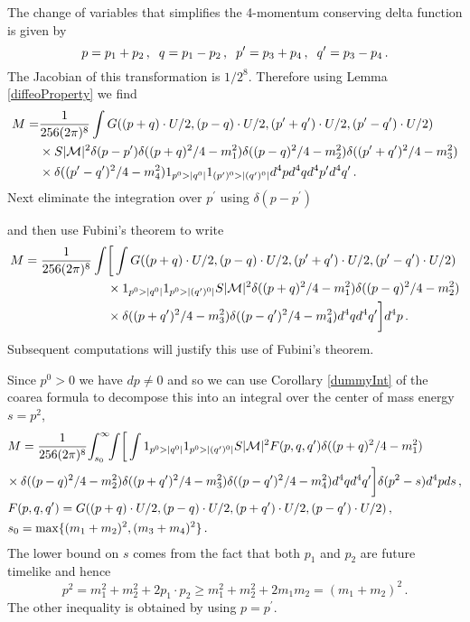 The change of variables that simplifies the 4-momentum conserving delta function is given by
\begin{equation}
p=p_1+p_2\,,\hspace{2mm} q=p_1-p_2\,, \hspace{2mm} p^{\prime}=p_3+p_4\,, \hspace{2mm} q^{\prime}=p_3-p_4\,.
\end{equation}
The Jacobian of this transformation is $1/2^{8}$.  Therefore using Lemma \ref{diffeoProperty} we find
\begin{align}\label{Meq1}
M=&\frac{1}{256(2\pi)^8 }\int   G((p+q)\cdot U/2,(p-q)\cdot  U/2,(p^{\prime}+q^{\prime})\cdot U/2, (p^{\prime}-q^{\prime})\cdot U/2)\notag\\ 
&\times S |\mathcal{M}|^2  \delta(p-p^{\prime})\delta((p+q)^2/4-m_1^2)\delta((p-q)^2/4-m_2^2)\delta((p^{\prime}+q^{\prime})^2/4-m_3^2)\notag\\
&\times\delta((p^{\prime}-q^{\prime})^2/4-m_4^2)1_{p^0>|q^0|} 1_{(p^{\prime})^0>|(q^{\prime})^0|}d^4pd^4qd^4p^{\prime}d^4q^{\prime}\,.
\end{align}
Next eliminate the integration over $p^{\prime}$ using $\delta(p-p^{\prime})$
 \begin{comment} 
using associative property
\end{comment}
 and then use Fubini's theorem to write
\begin{align}\label{useFubini}
M=\frac{1}{256(2\pi)^8 }\int &\bigg[ \int G((p+q)\cdot U/2,(p-q)\cdot  U/2,(p^{\prime}+q^{\prime})\cdot U/2, (p^{\prime}-q^{\prime})\cdot U/2)\notag\\ 
&\times  1_{p^0>|q^0|} 1_{p^0>|(q^{\prime})^0|}S |\mathcal{M}|^2 \delta((p+q)^2/4-m_1^2)\delta((p-q)^2/4-m_2^2)\notag\\
&\times \delta((p+q^{\prime})^2/4-m_3^2)\delta((p-q^{\prime})^2/4-m_4^2)d^4qd^4q^{\prime}\bigg]d^4p\,.
\end{align}
Subsequent computations will justify this use of Fubini's theorem.


Since $p^0>0$ we have $dp\neq 0$ and so we can use Corollary \ref{dummyInt} of the coarea formula to decompose this into an integral over the center of mass energy $s=p^2$,
\begin{align}\label{Meq2}
&M=\frac{1}{256(2\pi)^8 }\!\int_{s_0}^\infty\!\!\int \!\bigg[\int 1_{p^0>|q^0|} 1_{p^0>|(q^{\prime})^0|}  S |\mathcal{M}|^2  F(p,q,q^{\prime}) \delta((p+q)^2/4-m_1^2)\\
&\!\times\delta((p-q)^2/4-m_2^2)\delta((p+q^{\prime})^2/4-m_3^2)\delta((p-q^{\prime})^2/4-m_4^2)d^4qd^4q^{\prime}\bigg]\delta(p^2-s) d^4pds\,,\notag\\
&F(p,q,q^{\prime})=G((p+q)\cdot U/2,(p-q)\cdot  U/2,(p+q^{\prime})\cdot U/2, (p-q^{\prime})\cdot U/2)\,,\notag\\
&s_0=\max\{(m_1+m_2)^2,(m_3+m_4)^2\}\,.\notag
\end{align}
The lower bound on $s$ comes from the fact that both $p_1$ and $p_2$ are future timelike and hence 
\begin{equation}
p^2=m_1^2+m_2^2+2p_1\cdot p_2\geq m_1^2+m_2^2+2m_1m_2=(m_1+m_2)^2\,.
\end{equation}
The other inequality is obtained by using $p=p^{\prime}$. 

